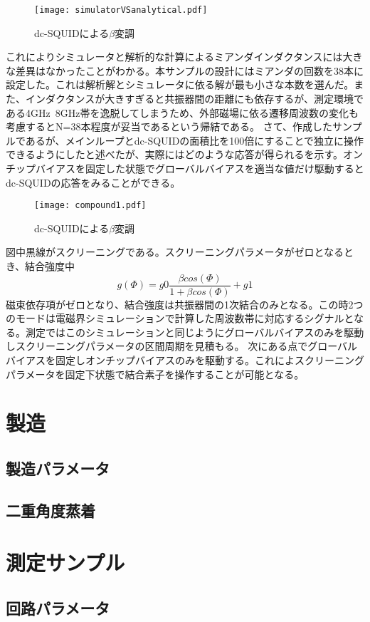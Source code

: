         \begin{figure}[H]
            \centering
            \texttt{[image: simulatorVSanalytical.pdf]}
            \caption{dc-SQUIDによる$\beta$変調}
        \end{figure}
        これによりシミュレータと解析的な計算によるミアンダインダクタンスには大きな差異はなかったことがわかる。本サンプルの設計にはミアンダの回数を38本に設定した。これは解析解とシミュレータに依る解が最も小さな本数を選んだ。また、インダクタンスが大きすぎると共振器間の距離にも依存するが、測定環境である4GHz~8GHz帯を逸脱してしまうため、外部磁場に依る遷移周波数の変化も考慮するとN=38本程度が妥当であるという帰結である。
        さて、作成したサンプルであるが、メインループとdc-SQUIDの面積比を100倍にすることで独立に操作できるようにしたと述べたが、実際にはどのような応答が得られるを示す。オンチップバイアスを固定した状態でグローバルバイアスを適当な値だけ駆動するとdc-SQUIDの応答をみることができる。
        \begin{figure}[H]
            \centering
            \texttt{[image: compound1.pdf]}
            \caption{dc-SQUIDによる$\beta$変調}
        \end{figure}
        図中黒線がスクリーニングである。スクリーニングパラメータがゼロとなるとき、結合強度中
        \begin{equation}
            g(\Phi) = g0\frac{\beta cos(\Phi)}{1+\beta cos(\Phi)} + g1
        \end{equation}
        磁束依存項がゼロとなり、結合強度は共振器間の1次結合のみとなる。この時2つのモードは電磁界シミュレーションで計算した周波数帯に対応するシグナルとなる。測定ではこのシミュレーションと同じようにグローバルバイアスのみを駆動しスクリーニングパラメータの区間周期を見積もる。
        次にある点でグローバルバイアスを固定しオンチップバイアスのみを駆動する。これによスクリーニングパラメータを固定下状態で結合素子を操作することが可能となる。
\section{製造}

    \subsection{製造パラメータ}

    \subsection{二重角度蒸着}

\section{測定サンプル}

    \subsection{回路パラメータ}
